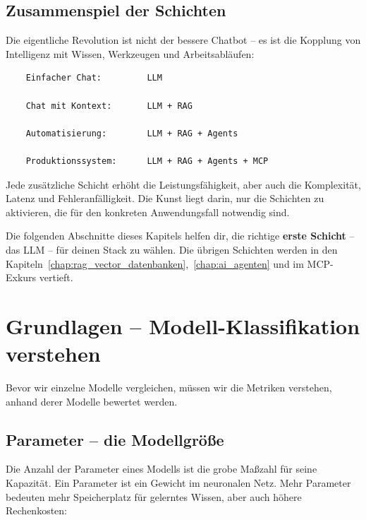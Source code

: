 \subsection{Zusammenspiel der Schichten}

Die eigentliche Revolution ist nicht der bessere Chatbot -- es ist die Kopplung von Intelligenz mit Wissen, Werkzeugen und Arbeitsabläufen:

\begin{verbatim}
    Einfacher Chat:         LLM
    
    Chat mit Kontext:       LLM + RAG
    
    Automatisierung:        LLM + RAG + Agents
    
    Produktionssystem:      LLM + RAG + Agents + MCP
\end{verbatim}

Jede zusätzliche Schicht erhöht die Leistungsfähigkeit, aber auch die Komplexität, Latenz und Fehleranfälligkeit. Die Kunst liegt darin, nur die Schichten zu aktivieren, die für den konkreten Anwendungsfall notwendig sind.

Die folgenden Abschnitte dieses Kapitels helfen dir, die richtige \textbf{erste Schicht} -- das LLM -- für deinen Stack zu wählen. Die übrigen Schichten werden in den Kapiteln~\ref{chap:rag_vector_datenbanken},~\ref{chap:ai_agenten} und im MCP-Exkurs vertieft.

\section{Grundlagen -- Modell-Klassifikation verstehen}

Bevor wir einzelne Modelle vergleichen, müssen wir die Metriken verstehen, anhand derer Modelle bewertet werden.

\subsection{Parameter -- die Modellgröße}

Die Anzahl der Parameter eines Modells ist die grobe Maßzahl für seine Kapazität. Ein Parameter ist ein Gewicht im neuronalen Netz. Mehr Parameter bedeuten mehr Speicherplatz für gelerntes Wissen, aber auch höhere Rechenkosten:

